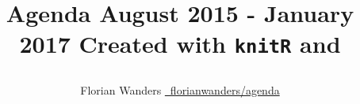 \documentclass[11pt,a4paper]{book}\usepackage[]{graphicx}\usepackage[]{color}
\def\lsin{\lstinline[basicstyle=\ttfamily,breaklines=true,]}%for inline verbatim
\begin{document}
\begin{titlepage}
\title{\parbox{\linewidth}{%
  \centering%
  Agenda\endgraf
  August 2015 - January 2017\endgraf\bigskip
  Created with \lsin{knitR} and \XeLaTeX
  }
}
\author{\parbox{\linewidth}{%
  \centering%
  Florian Wanders\endgraf\bigskip
  \href{https://github.com/FlorianWanders/agenda}{\faGithub~florianwanders/agenda}
  }
}
\date{}
\maketitle
\end{titlepage}

\newpage\null\thispagestyle{empty}\newpage 

\begin{landscape}


\end{landscape}
\end{document}
